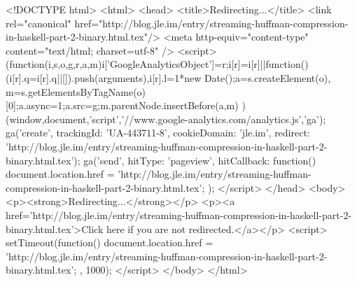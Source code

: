<!DOCTYPE html>
<html>
<head>
<title>Redirecting...</title>
<link rel="canonical" href="http://blog.jle.im/entry/streaming-huffman-compression-in-haskell-part-2-binary.html.tex"/>
<meta http-equiv="content-type" content="text/html; charset=utf-8" />
<script>
(function(i,s,o,g,r,a,m){i['GoogleAnalyticsObject']=r;i[r]=i[r]||function(){
(i[r].q=i[r].q||[]).push(arguments)},i[r].l=1*new Date();a=s.createElement(o),
m=s.getElementsByTagName(o)[0];a.async=1;a.src=g;m.parentNode.insertBefore(a,m)
})(window,document,'script','//www.google-analytics.com/analytics.js','ga');
ga('create', { trackingId: 'UA-443711-8', cookieDomain: 'jle.im', redirect: 'http://blog.jle.im/entry/streaming-huffman-compression-in-haskell-part-2-binary.html.tex'});
ga('send', { hitType: 'pageview', hitCallback: function() { document.location.href = 'http://blog.jle.im/entry/streaming-huffman-compression-in-haskell-part-2-binary.html.tex'; } });
</script>
</head>
<body>
  <p><strong>Redirecting...</strong></p>
  <p><a href='http://blog.jle.im/entry/streaming-huffman-compression-in-haskell-part-2-binary.html.tex'>Click here if you are not redirected.</a></p>
  <script>
    setTimeout(function() { document.location.href = 'http://blog.jle.im/entry/streaming-huffman-compression-in-haskell-part-2-binary.html.tex'; }, 1000);
  </script>
</body>
</html>
